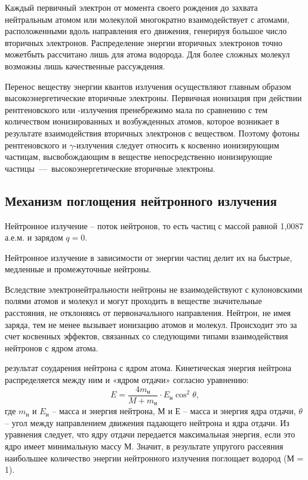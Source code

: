 \documentclass[a4paper, 14pt]{article}
\renewcommand{\emph}[1]{{\color{orange}{\textit{\textbf{#1}}}}}
\begin{document}
Каждый первичный электрон от момента своего рождения до захвата
нейтральным атомом или молекулой многократно взаимодействует с атомами,
расположенными вдоль направления его движения, генерируя большое число
вторичных электронов. Распределение энергии вторичных электронов точно можетбыть рассчитано лишь для атома водорода. Для более сложных молекул возможны
лишь качественные рассуждения.

Перенос веществу энергии квантов излучения осуществляют главным образом
высокоэнергетические вторичные электроны. Первичная ионизация при действии
рентгеновского или -излучения пренебрежимо мала по сравнению с тем количеством
ионизированных и возбужденных атомов, которое возникает в результате
взаимодействия вторичных электронов с веществом. Поэтому фотоны рентгеновского
и $\gamma$-излучения следует относить к косвенно ионизирующим частицам,
высвобождающим в веществе непосредственно ионизирующие частицы~---~высокоэнергетические вторичные электроны.

\subsection{Механизм поглощения нейтронного излучения}
Нейтронное излучение – поток нейтронов, то есть частиц с массой равной 1,0087 а.е.м. и зарядом $q = 0$.

Нейтронное излучение в зависимости от энергии частиц делит их на быстрые,
медленные и промежуточные нейтроны.

Вследствие электронейтральности нейтроны не взаимодействуют с кулоновскими полями атомов и молекул и могут проходить в веществе значительные расстояния, не отклоняясь от первоначального направления. Нейтрон, не имея заряда, тем не менее вызывает ионизацию атомов и молекул. Происходит это за счет косвенных эффектов, связанных со следующими типами взаимодействия нейтронов с ядром атома.

\emph{I. Упругое рассеяние} результат соударения нейтрона с ядром атома. Кинетическая энергия нейтрона распределяется между ним и «ядром отдачи» согласно уравнению: 
\begin{equation}
    E = \frac{4m_\text{н}}{M+m_\text{н}}\cdot E_\text{н}\cos^2\theta, 
\end{equation}
где $m_\text{н}$ и $E_\text{н}$ – масса и энергия нейтрона, $М$ и $Е$ – масса и энергия ядра отдачи, $\theta$ – угол между направлением движения падающего нейтрона и ядра отдачи. Из уравнения следует, что ядру отдачи передается максимальная энергия, если это ядро имеет минимальную массу $М$. Значит, в результате упругого рассеяния наибольшее количество энергии нейтронного излучения поглощает водород (М = 1). 
\end{document}
